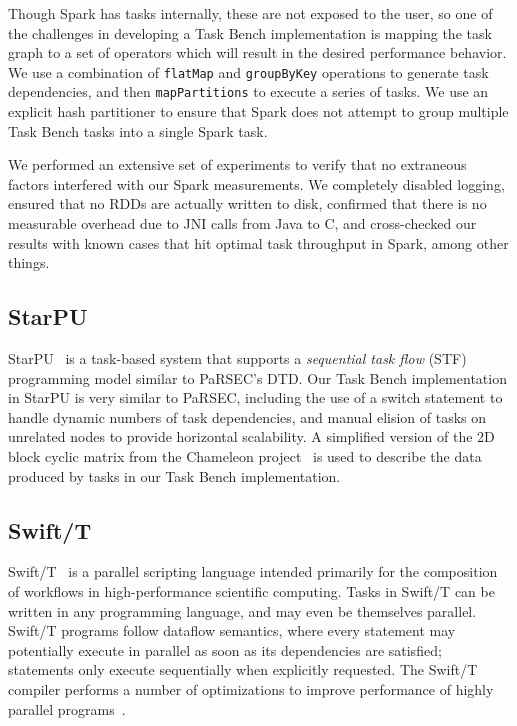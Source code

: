 Though Spark has tasks internally, these are not exposed to the user,
so one of the challenges in developing a Task Bench implementation is
mapping the task graph to a set of operators which will result in the
desired performance behavior. We use a combination of
\lstinline[language=Scala]{flatMap} and
\lstinline[language=Scala]{groupByKey} operations to generate task
dependencies, and then \lstinline[language=Scala]{mapPartitions} to execute a
series of tasks. We use an explicit hash partitioner to ensure that
Spark does not attempt to group multiple Task Bench tasks into a
single Spark task.

We performed an extensive set of experiments to verify that no
extraneous factors interfered with our Spark measurements. We
completely disabled logging, ensured that no RDDs are actually written
to disk, confirmed that there is no measurable overhead due to JNI
calls from Java to C, and cross-checked our results with known cases
that hit optimal task throughput in Spark, among other things.

\subsection{StarPU}

StarPU~\cite{StarPU11} is a task-based system that supports a \emph{sequential task flow} (STF)
programming model similar to PaRSEC's DTD. Our Task Bench implementation in
StarPU is very similar to PaRSEC, including the use of a switch
statement to handle dynamic numbers of task dependencies, and manual
elision of tasks on unrelated nodes to provide horizontal scalability.
A simplified version of the 2D block cyclic matrix from the Chameleon 
project~\cite{Chameleon} is used to describe the data produced by tasks in 
our Task Bench implementation.

\subsection{Swift/T}

Swift/T~\cite{Wozniak13} is a parallel scripting language intended
primarily for the composition of workflows in high-performance
scientific computing. Tasks in Swift/T can be written in any
programming language, and may even be themselves parallel. Swift/T
programs follow dataflow semantics, where every statement may
potentially execute in parallel as soon as its dependencies are
satisfied; statements only execute sequentially when explicitly
requested. The Swift/T compiler performs a number of optimizations to
improve performance of highly parallel programs~\cite{Armstrong14}.


